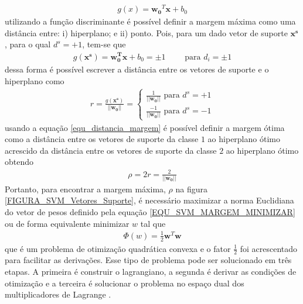 \begin{align}
g(x) = \mathbf{w_{0}}^{T}\mathbf{x} + b_{0} 							\label{EQU_SVM_FUNCAO_DISCRIMINANTE}
\end{align}
utilizando a função discriminante é possível definir a margem máxima como uma distância entre: i) hiperplano; e ii) ponto. Pois, para um dado vetor de suporte \(\mathbf{x^{s}}\), para o qual \(d^{s} = +1\), tem-se que
\begin{align}
g(\mathbf{x^{s}}) = \mathbf{w^{T}_{0}}\mathbf{x} + b_{0} = \pm 1 \qquad \textrm{ para } d_{i} = \pm 1
\end{align}
dessa forma é possível escrever a distância entre os vetores de suporte e o hiperplano como
\begin{align}
r = \frac{g(\mathbf{x^{s}})}{||\mathbf{w_{0}}||} = 	\begin{cases} \label{equ_distancia_margem}
														\frac{1}{||\mathbf{w_{0}}||}  \textrm{ para } d^{s} = +1 \\
														\frac{-1}{||\mathbf{w_{0}}||} \textrm{ para } d^{s} = -1
													\end{cases}
\end{align}
usando a equação \eqref{equ_distancia_margem} é possível definir a margem ótima como a distância entre os vetores de suporte da classe \(1\) ao hiperplano ótimo acrescido da distância entre os vetores de suporte da classe \(2\) ao hiperplano ótimo obtendo
\begin{align}
\rho = 2r = \frac{2}{||\mathbf{w_{0}}||} \label{EQU_SVM_MARGEM_MINIMIZAR}
\end{align}
Portanto, para encontrar a margem máxima, \(\rho\) na figura \ref{FIGURA_SVM_Vetores_Suporte}, é necessário maximizar a norma Euclidiana do vetor de pesos definido pela equação \eqref{EQU_SVM_MARGEM_MINIMIZAR} ou de forma equivalente minimizar \(w\) tal que
\begin{align}  
\Phi(w) = \frac{1}{2}\mathbf{w}^{T}\mathbf{w} \label{EQU_SVM_MARGEM_EQUIVALENTE_MAXIMIZAR}
\end{align}
que é um problema de otimização quadrática convexa \cite{LIMA2004} e o fator \(\frac{1}{2}\) foi acrescentado para facilitar as derivações. Esse tipo de problema pode ser solucionado em três etapas. A primeira é construir o lagrangiano, a segunda é derivar as condições de otimização e a terceira é solucionar o problema no espaço dual dos multiplicadores de Lagrange \cite{Haykin2007}.
